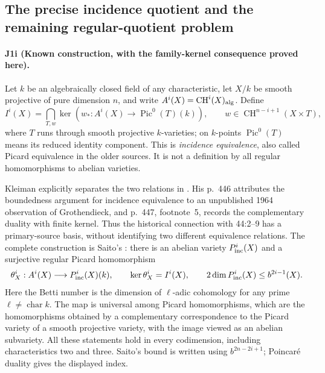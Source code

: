 \subsection{The precise incidence quotient and the remaining regular-quotient problem}
\paragraph{J1i (Known construction, with the family-kernel consequence proved here).}
Let $k$ be an algebraically closed field of any characteristic, let
$X/k$ be smooth projective of pure dimension $n$, and write
$A^i(X)=\operatorname{CH}^i(X)_{\rm alg}$. Define
\[
 I^i(X)=\bigcap_{T,w}\ker\left(
 w_*:A^i(X)\longrightarrow\operatorname{Pic}^0(T)(k)\right),
 \qquad w\in\operatorname{CH}^{n-i+1}(X\times T),
\]
where $T$ runs through smooth projective $k$-varieties; on $k$-points
$\operatorname{Pic}^0(T)$ means its reduced identity component.
This is \emph{incidence equivalence}, also called Picard equivalence
in the older sources. It is not a definition by all regular
homomorphisms to abelian varieties.

Kleiman explicitly separates the two relations in
\cite[pp.~446--447]{DGJ_Kleiman1971}. His p.~446 attributes the
boundedness argument for incidence equivalence to an unpublished
1964 observation of Grothendieck, and p.~447, footnote~5, records
the complementary duality with finite kernel. Thus the historical
connection with 44:2--9 has a primary-source basis, without
identifying two different equivalence relations.
The complete construction is Saito's
\cite[Definition 3.1, p.~108; Proposition 3.4, pp.~109--110;
Theorem 3.6, pp.~110--111]{DGJ_Saito1979}: there is an abelian
variety $P^i_{\rm inc}(X)$ and a surjective regular Picard
homomorphism
\[
 \theta_X^i:A^i(X)\longrightarrow P^i_{\rm inc}(X)(k),
 \qquad\ker\theta_X^i=I^i(X),
 \qquad 2\dim P^i_{\rm inc}(X)\leq b^{2i-1}(X).
\]
Here the Betti number is the dimension of $\ell$-adic cohomology
for any prime $\ell\ne\operatorname{char}k$. The map is universal
among Picard homomorphisms, which are the homomorphisms obtained
by a complementary correspondence to the Picard variety of a
smooth projective variety, with the image viewed as an abelian
subvariety. All these statements hold in every codimension,
including characteristics two and three. Saito's bound is written
using $b^{2n-2i+1}$; Poincaré duality gives the displayed index.

